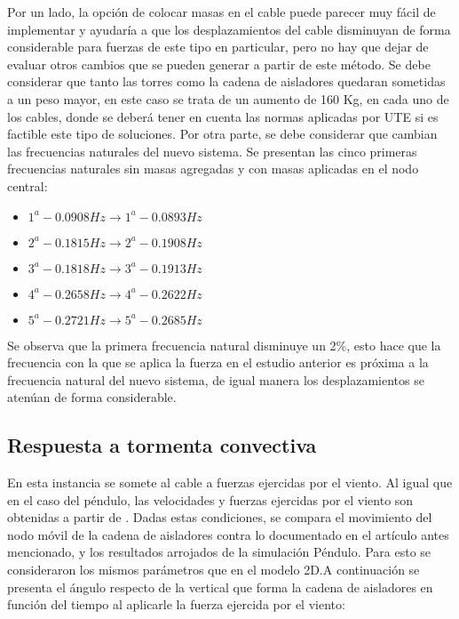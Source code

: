Por un lado, la opción de colocar masas en el cable puede parecer muy fácil de implementar y ayudaría a que los desplazamientos del cable disminuyan de forma considerable para fuerzas de este tipo en particular, pero no hay que dejar de evaluar otros cambios que se pueden generar a partir de este método. Se debe considerar que tanto las torres como la cadena de aisladores quedaran sometidas a un peso mayor, en este caso se trata de un aumento de 160 Kg, en cada uno de los cables, donde se deberá tener en cuenta las normas aplicadas por UTE si es factible este tipo de soluciones.
Por otra parte, se debe considerar que cambian las frecuencias naturales del nuevo sistema. Se presentan las cinco primeras frecuencias naturales sin masas agregadas y con masas aplicadas en el nodo central:

\begin{itemize}
	\item $1^a - 0.0908 Hz \rightarrow 1^a - 0.0893 Hz$
	\item $2^a - 0.1815 Hz \rightarrow 2^a - 0.1908 Hz$
	\item $3^a - 0.1818 Hz \rightarrow 3^a - 0.1913 Hz$
	\item $4^a - 0.2658 Hz \rightarrow 4^a - 0.2622 Hz$
	\item $5^a - 0.2721 Hz \rightarrow 5^a - 0.2685 Hz$
\end{itemize}



Se observa que la primera frecuencia natural disminuye un 2\%, esto hace que la frecuencia con la que se aplica la fuerza en el estudio anterior es próxima a la frecuencia natural del nuevo sistema, de igual manera los desplazamientos se atenúan de forma considerable.

\subsection{Respuesta a tormenta convectiva}

En esta instancia se somete al cable a fuerzas ejercidas por el viento. Al igual que en el caso del péndulo, las velocidades y fuerzas ejercidas por el viento son obtenidas a partir de \cite{stengel2017measurements}. Dadas estas condiciones, se compara el movimiento del nodo móvil de la cadena de aisladores contra lo documentado en el artículo antes mencionado, y los resultados arrojados de la simulación Péndulo. Para esto se consideraron los mismos parámetros que en el modelo 2D.A continuación se presenta el ángulo respecto de la vertical que forma la cadena de aisladores en función del tiempo al aplicarle la fuerza ejercida por el viento:



